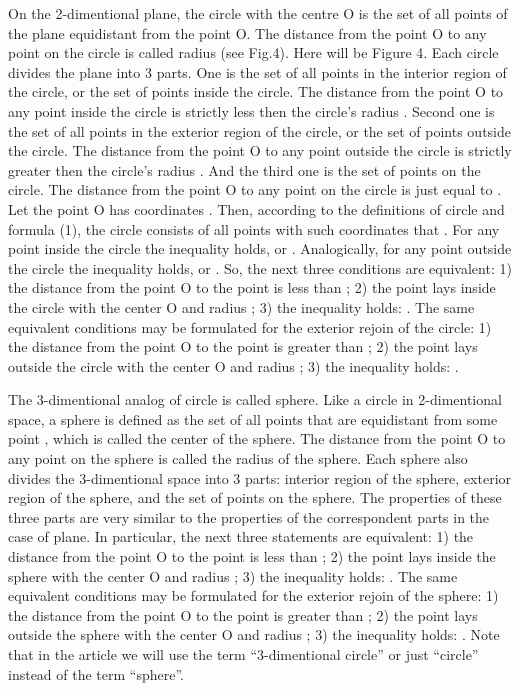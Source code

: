 \documentclass{article}
\begin{document}
On the 2-dimentional plane, the circle with the centre O is the set of all points of the plane equidistant from the point O.
The distance      from the point O to any point on the circle is called radius (see Fig.4).
Here will be Figure 4.
Each circle divides the plane into 3 parts.
One is the set of all points in the interior region of the circle, or the set of points inside the circle.
The distance from the point O to any point      inside the circle is strictly less then the circle’s radius     .
Second one is the set of all points in the exterior region of the circle, or the set of points outside the circle.
The distance from the point O to any point      outside the circle is strictly greater then the circle’s radius     .
And the third one is the set of points on the circle.
The distance from the point O to any point      on the circle is just equal to     .
Let the point O has coordinates     .
Then, according to the definitions of circle and formula (1), the circle consists of all points with such coordinates      that
    .
For any point      inside the circle the inequality      holds, or
    .
Analogically, for any point      outside the circle the inequality      holds, or
    .
So, the next three conditions are equivalent:
1) the distance      from the point O to the point      is less than     ;
2) the point      lays inside the circle with the center O and radius     ;
3) the inequality holds:
    .
The same equivalent conditions may be formulated for the exterior rejoin of the circle:
1) the distance      from the point O to the point      is greater than     ;
2) the point      lays outside the circle with the center O and radius     ;
3) the inequality holds:
    .

The 3-dimentional analog of circle is called sphere. Like a circle in 2-dimentional space,
a sphere is defined as the set of all points that are equidistant from some point     , which is called the center of the sphere.
The distance from the point O to any point      on the sphere is called the radius of the sphere.
Each sphere also divides the 3-dimentional space into 3 parts: interior region of the sphere, exterior region of the sphere, and the set of points on the sphere.
The properties of these three parts are very similar to the properties of the correspondent parts in the case of plane.
In particular, the next three statements are equivalent:
1) the distance      from the point O to the point      is less than     ;
2) the point      lays inside the sphere with the center O and radius     ;
3) the inequality holds:
    .
The same equivalent conditions may be formulated for the exterior rejoin of the sphere:
1) the distance      from the point O to the point      is greater than     ;
2) the point      lays outside the sphere with the center O and radius     ;
3) the inequality holds:
    .
Note that in the article we will use the term “3-dimentional circle” or just “circle” instead of the term “sphere”.
\end{document}
